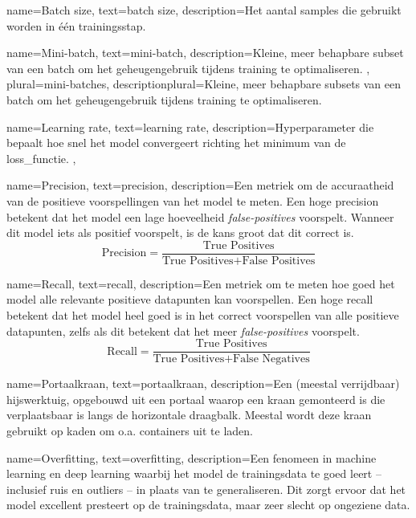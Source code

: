 {
    name={Batch size},
    text={batch size},
    description={Het aantal samples die gebruikt worden in één trainingsstap. \autocite{Geron_2023}}
}

{
    name={Mini-batch},
    text={mini-batch},
    description={Kleine, meer behapbare subset van een batch om het geheugengebruik tijdens training te optimaliseren. \autocite{Geron_2023}},
    plural={mini-batches},
    descriptionplural={Kleine, meer behapbare subsets van een batch om het geheugengebruik tijdens training te optimaliseren. \autocite{Geron_2023}}    
}

{
    name={Learning rate},
    text={learning rate},
    description={Hyperparameter die bepaalt hoe snel het model convergeert richting het minimum van de \gls{loss_functie}. \autocite{Geron_2023}},
}

{
    name={Precision},
    text={precision},
    description={Een metriek om de accuraatheid van de positieve voorspellingen van het model te meten. Een hoge precision betekent dat het model een lage hoeveelheid \emph{false-positives} voorspelt. Wanneer dit model iets als positief voorspelt, is de kans groot dat dit correct is. 
        $$
        \text{Precision} = \frac{\text{True Positives}}{\text{True Positives} + \text{False Positives}}
        $$
        \autocite{Geron_2023}}
}

{
    name={Recall},
    text={recall},
    description={Een metriek om te meten hoe goed het model alle relevante positieve datapunten kan voorspellen. Een hoge recall betekent dat het model heel goed is in het correct voorspellen van alle positieve datapunten, zelfs als dit betekent dat het meer \emph{false-positives} voorspelt.
        $$
        \text{Recall} = \frac{\text{True Positives}}{\text{True Positives} + \text{False Negatives}}
        $$
        \autocite{Geron_2023}}
}

{
    name={Portaalkraan},
    text={portaalkraan},
    description={Een (meestal verrijdbaar) hijswerktuig, opgebouwd uit een portaal waarop een kraan gemonteerd is die verplaatsbaar is langs de horizontale draagbalk. Meestal wordt deze kraan gebruikt op kaden om o.a. containers uit te laden.}
}

{
    name={Overfitting},
    text={overfitting},
    description={Een fenomeen in machine learning en deep learning waarbij het model de trainingsdata te goed leert -- inclusief ruis en outliers -- in plaats van te generaliseren. Dit zorgt ervoor dat het model excellent presteert op de trainingsdata, maar zeer slecht op ongeziene data.}
}

